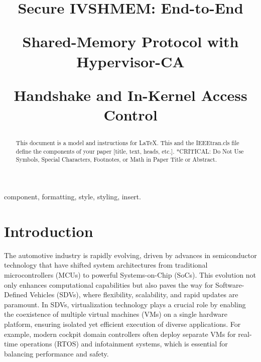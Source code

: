\documentclass[conference]{IEEEtran}
\begin{document}
\title{
  Secure IVSHMEM: End-to-End

  Shared-Memory Protocol with Hypervisor-CA

  Handshake and In-Kernel Access Control }

\author{
  \and
  \and
}

\maketitle

\begin{abstract}
  This document is a model and instructions for \LaTeX.
  This and the IEEEtran.cls file define the components of your paper [title, text, heads, etc.]. *CRITICAL: Do Not Use Symbols, Special Characters, Footnotes,
  or Math in Paper Title or Abstract.
\end{abstract}

\begin{IEEEkeywords}
  component, formatting, style, styling, insert.
\end{IEEEkeywords}

\section{Introduction}
The automotive industry is rapidly evolving, driven by advances in
semiconductor technology that have shifted system architectures from
traditional microcontrollers (MCUs) to powerful Systems-on-Chip (SoCs). This
evolution not only enhances computational capabilities but also paves the way
for Software-Defined Vehicles (SDVs), where flexibility, scalability, and rapid
updates are paramount. In SDVs, virtualization technology plays a crucial role
by enabling the coexistence of multiple virtual machines (VMs) on a single
hardware platform, ensuring isolated yet efficient execution of diverse
applications. For example, modern cockpit domain controllers often deploy
separate VMs for real-time operations (RTOS) and infotainment systems, which is
essential for balancing performance and safety.
\end{document}
